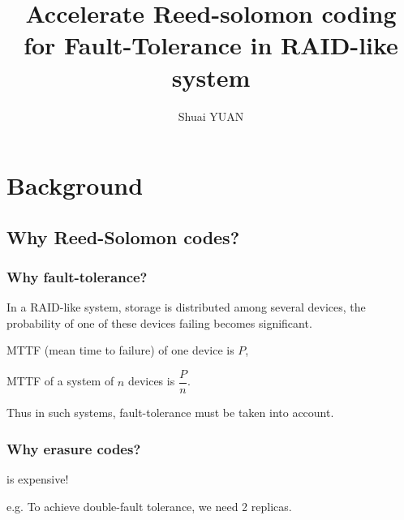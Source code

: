 \documentclass[slidestop,compress,mathserif]{beamer}
\title[Accelerate Reed-solomon coding for Fault-Tolerance in RAID-like system]{Accelerate Reed-solomon coding for Fault-Tolerance in RAID-like system}
\author{Shuai YUAN}
\institute[LSA lab,  NTHU]{
  NTHU \\
  LSA lab}
\date{}
\begin{document}
\frame{\titlepage}

\section{Background} %
\subsection{Why Reed-Solomon codes?} %
\begin{frame}[options]
\frametitle{Why fault-tolerance?}
In a RAID-like system, storage is distributed among several devices, the probability of one of these devices failing becomes significant. 

{
MTTF (mean time to failure) of one device is $P$, 

MTTF of a system of $n$ devices is $\dfrac{P}{n}$.
}

{
Thus in such systems, fault-tolerance must be taken into account.
}
\end{frame}

\begin{frame}[options]
\frametitle{Why erasure codes?}
{\color{blue}{Replication}} is expensive!

e.g. To achieve double-fault tolerance,
we need 2 replicas.


\end{frame}
\end{document}
